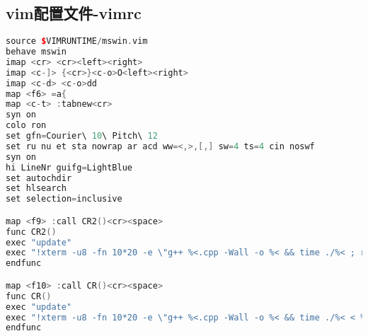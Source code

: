 \subsection{vim配置文件-vimrc}
    \begin{lstlisting}[language=c++]
source $VIMRUNTIME/mswin.vim
behave mswin
imap <cr> <cr><left><right>
imap <c-]> {<cr>}<c-o>O<left><right>
imap <c-d> <c-o>dd
map <f6> =a{
map <c-t> :tabnew<cr>
syn on
colo ron
set gfn=Courier\ 10\ Pitch\ 12
set ru nu et sta nowrap ar acd ww=<,>,[,] sw=4 ts=4 cin noswf
syn on
hi LineNr guifg=LightBlue
set autochdir
set hlsearch
set selection=inclusive

map <f9> :call CR2()<cr><space>
func CR2()
exec "update"
exec "!xterm -u8 -fn 10*20 -e \"g++ %<.cpp -Wall -o %< && time ./%< ; read -n 1\""
endfunc

map <f10> :call CR()<cr><space>
func CR()
exec "update"
exec "!xterm -u8 -fn 10*20 -e \"g++ %<.cpp -Wall -o %< && time ./%< < %<.in ; read -n 1\""
endfunc


\end{lstlisting}
